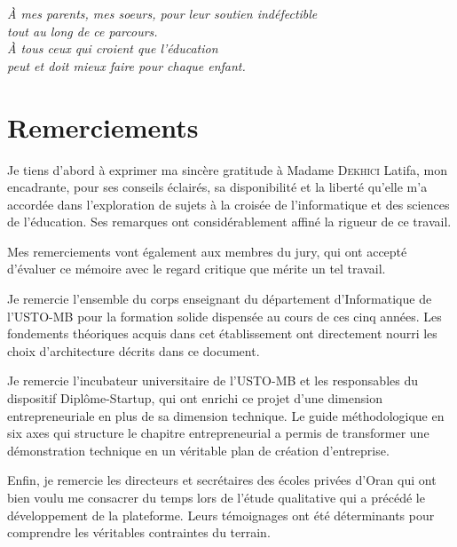 \documentclass[12pt,a4paper,oneside]{report}
\begin{document}

\clearpage

\clearpage
\thispagestyle{empty}
\vspace*{4cm}
\begin{flushright}
\itshape
À mes parents, mes soeurs, pour leur soutien indéfectible\\
tout au long de ce parcours.\\[12pt]
À tous ceux qui croient que l'éducation\\
peut et doit mieux faire pour chaque enfant.
\end{flushright}
\clearpage

\chapter*{Remerciements}
\thispagestyle{plain}

Je tiens d'abord à exprimer ma sincère gratitude à Madame \textsc{Dekhici} Latifa, mon encadrante, pour ses conseils éclairés, sa disponibilité et la liberté qu'elle m'a accordée dans l'exploration de sujets à la croisée de l'informatique et des sciences de l'éducation. Ses remarques ont considérablement affiné la rigueur de ce travail.

Mes remerciements vont également aux membres du jury, qui ont accepté d'évaluer ce mémoire avec le regard critique que mérite un tel travail.

Je remercie l'ensemble du corps enseignant du département d'Informatique de l'USTO-MB pour la formation solide dispensée au cours de ces cinq années. Les fondements théoriques acquis dans cet établissement ont directement nourri les choix d'architecture décrits dans ce document.

Je remercie l'incubateur universitaire de l'USTO-MB et les responsables du dispositif Diplôme-Startup, qui ont enrichi ce projet d'une dimension entrepreneuriale en plus de sa dimension technique. Le guide méthodologique en six axes qui structure le chapitre entrepreneurial a permis de transformer une démonstration technique en un véritable plan de création d'entreprise.

Enfin, je remercie les directeurs et secrétaires des écoles privées d'Oran qui ont bien voulu me consacrer du temps lors de l'étude qualitative qui a précédé le développement de la plateforme. Leurs témoignages ont été déterminants pour comprendre les véritables contraintes du terrain.
\end{document}
